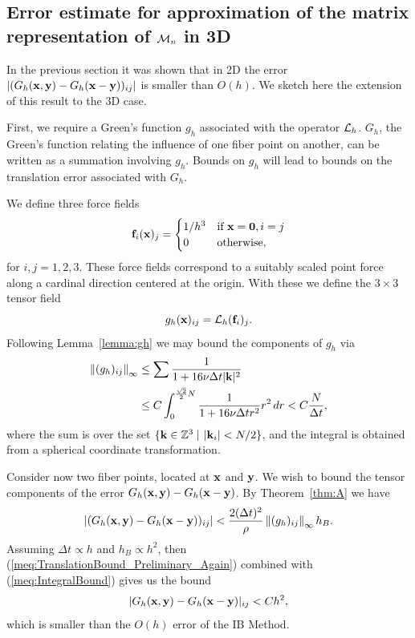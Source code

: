 \subsection{Error estimate for approximation of the matrix representation of $\mathcal{M}_n$ in 3D}
\label{sub:TranslationError_3D}
In the previous section it was shown that in 2D the error $|(G_h(\mathbf{x},\mathbf{y})-G_h(\mathbf{x}-\mathbf{y}))_{ij}|$ is smaller than $O(h)$. We sketch here the extension of this result to the 3D case.

First, we require a Green's function $g_h$ associated with the operator $\mathcal{L}_h$. $G_h$, the Green's function relating the influence of one fiber point on another, can be written as a summation involving $g_h$. Bounds on $g_h$ will lead to bounds on the translation error associated with $G_h$.

We define three force fields
\begin{equation}
\mathbf{f}_i(\mathbf{x})_j = \begin{cases}
1/h^3& \textrm{if } \mathbf{x} = \mathbf{0}, i=j \\
0& \textrm{otherwise,}
\end{cases}
\end{equation}
for $i,j=1,2,3$. These force fields correspond to a suitably scaled point force along a cardinal direction centered at the origin. With these we define the $3\times 3$ tensor field
\begin{equation}
g_h(\mathbf{x})_{ij} = \mathcal{L}_h(\mathbf{f}_i)_j.
\end{equation}
Following Lemma~\ref{lemma:gh} we may bound the components of $g_h$ via
\begin{equation}
\label{meq:IntegralBound}
\begin{split}
\norm{(g_h)_{ij}}_\infty &\leq
\sum %
\frac{1}{1 + 16\nu\Delta t |\B{k}|^2} \\
&\leq C \int_0^{\frac{\sqrt{2}}{2}N}\frac{1}{1 + 16\nu\Delta t r^2}r^2\,dr
< C\frac{N}{\Delta t},
\end{split}
\end{equation}
where the sum is over the set $\{\mathbf{k}\in\mathbb{Z}^3 \: | \,\: |\mathbf{k}_i| < N/2\}$, and the integral is obtained from a spherical coordinate transformation.

Consider now two fiber points, located at $\mathbf{x}$ and $\mathbf{y}$. We wish to bound the tensor components of the error $G_h(\mathbf{x},\mathbf{y})-G_h(\mathbf{x}-\mathbf{y})$. By Theorem~\ref{thm:A} we have 
\begin{equation}
|(G_h(\mathbf{x},\mathbf{y})-G_h(\mathbf{x}-\mathbf{y}))_{ij}|
< 
\frac{2(\Delta t)^2}{\rho} \left\lVert(g_h)_{ij}\right\rVert_\infty h_B.
\label{meq:TranslationBound_Preliminary_Again}
\end{equation}
Assuming $\Delta t \propto h$ and $h_B \propto h^2$, then (\ref{meq:TranslationBound_Preliminary_Again}) combined with (\ref{meq:IntegralBound}) gives us the bound
\begin{equation}
|G_h(\mathbf{x},\mathbf{y})-G_h(\mathbf{x}-\mathbf{y})|_{ij}
< 
C h^2,
\end{equation}
which is smaller than the $O(h)$ error of the IB Method.




